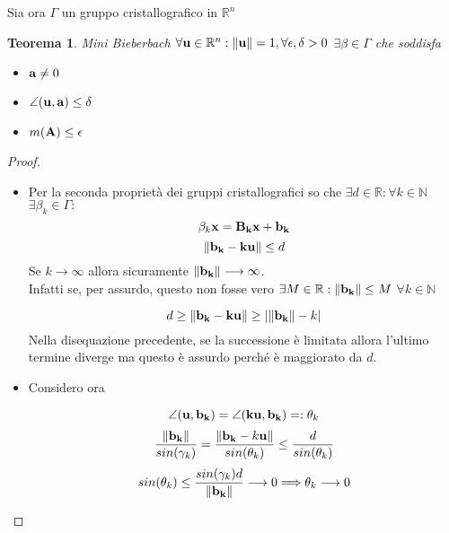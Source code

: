 \documentclass[10pt,a4paper]{article}
\newtheorem{theorem}{Teorema}[section]
\begin{document}
Sia ora $\Gamma$ un gruppo cristallografico in $\mathbb{R}^n$ 

\begin{theorem}{Mini Bieberbach}
 $ \forall \vb{u} \in \mathbb{R}^n : \norm{\vb{u}} = 1,   \forall \epsilon , \delta >0 $  $   \exists \beta \in \Gamma $ che soddisfa  
\begin{itemize}
\item $\vb{a} \neq 0$ 
\item $ \angle (\vb{u, a}) \leq \delta $
\item $ m(\vb{A}) \leq \epsilon$ 
\end{itemize}
\end{theorem}

\begin{proof}
\begin{itemize}

\item  Per la seconda proprietà dei gruppi cristallografici so che $ \exists d \in \mathbb{R} : \forall k \in \mathbb{N} $ $  \exists \beta_k \in \Gamma : $ \\
\[ \beta_k \vb{x} = \vb{B_k x + b_k}  \]
\[ \norm{\vb{b_k - ku }} \leq d \] 
Se $k \longrightarrow \infty$ allora sicuramente $ \norm{\vb{b_k}} \longrightarrow \infty$.  \\
Infatti se, per assurdo, questo non fosse vero $\exists M \in \mathbb{R} : \norm{\vb{b_k}} \leq M $   $  \forall k \in \mathbb{N} $

\[ d \geq \norm{\vb{b_k - ku}} \geq | \norm{\vb{b_k}} - k | \]
Nella disequazione  precedente, se la successione è limitata allora l'ultimo termine diverge ma questo è assurdo perché è maggiorato da $d$. 

\item Considero ora \\
\begin{minipage}{0.5\textwidth}
\end{minipage}\hfill
\begin{minipage}{0.5\textwidth}
	\[ \angle (\vb{u , b_k}) = \angle (\vb{ku, b_k}) = : \theta_k \]
\[ \frac{\norm{\vb{b_k}}}{sin(\gamma_k)} = \frac{\norm{\vb{b_k} - k\vb{u}}}{sin(\theta_k)}  \leq \frac{d}{sin(\theta_k)} \]
\[  sin(\theta_k) \leq \frac{sin(\gamma_k)d}{\norm{\vb{b_k}}} \longrightarrow 0 \Longrightarrow \theta_k \longrightarrow 0 \]
\end{minipage}







\end{itemize}
\end{proof}
\end{document}
